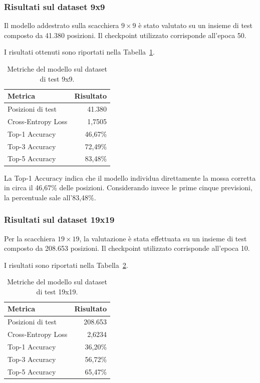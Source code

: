 \subsubsection{Risultati sul dataset 9x9}

Il modello addestrato sulla scacchiera $9 \times 9$ è stato valutato su un insieme di test composto da 41.380 posizioni. Il checkpoint utilizzato corrisponde all'epoca 50.

I risultati ottenuti sono riportati nella Tabella~\ref{tab:test_9x9}.

\begin{table}[htbp]
    \centering
    \caption{Metriche del modello sul dataset di test 9x9.}
    \label{tab:test_9x9}
    \begin{tabular}{lr}
        \hline
        \textbf{Metrica}   & \textbf{Risultato} \\
        \hline
        Posizioni di test  & 41.380             \\
        Cross-Entropy Loss & 1,7505             \\
        Top-1 Accuracy     & 46,67\%            \\
        Top-3 Accuracy     & 72,49\%            \\
        Top-5 Accuracy     & 83,48\%            \\
        \hline
    \end{tabular}
\end{table}

La Top-1 Accuracy indica che il modello individua direttamente la mossa corretta in circa il 46,67\% delle posizioni. Considerando invece le prime cinque previsioni, la percentuale sale all'83,48\%.

\subsubsection{Risultati sul dataset 19x19}

Per la scacchiera $19 \times 19$, la valutazione è stata effettuata su un insieme di test composto da 208.653 posizioni. Il checkpoint utilizzato corrisponde all'epoca 10.

I risultati sono riportati nella Tabella~\ref{tab:test_19x19}.

\begin{table}[htbp]
    \centering
    \caption{Metriche del modello sul dataset di test 19x19.}
    \label{tab:test_19x19}
    \begin{tabular}{lr}
        \hline
        \textbf{Metrica}   & \textbf{Risultato} \\
        \hline
        Posizioni di test  & 208.653            \\
        Cross-Entropy Loss & 2,6234             \\
        Top-1 Accuracy     & 36,20\%            \\
        Top-3 Accuracy     & 56,72\%            \\
        Top-5 Accuracy     & 65,47\%            \\
        \hline
    \end{tabular}
\end{table}

